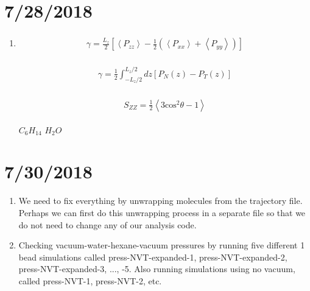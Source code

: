 \documentclass[12pt,reqno]{amsart}
\numberwithin{equation}{section}
\begin{document}
\section{7/28/2018}
\begin{enumerate}
\item 
\begin{align}
\begin{split}
\gamma = \frac{L_z}{2}\left[\left<P_{zz}\right> - \frac{1}{2}(\left<P_{xx}\right> + \left<P_{yy}\right>)\right]
\end{split}
\end{align}

\begin{align}
\begin{split}
\gamma = \frac{1}{2}\int_{-L_z/2}^{L_z/2}dz\left[P_N(z) - P_T(z)\right]
\end{split}
\end{align}

\begin{align}
\begin{split}
S_{ZZ} = \frac{1}{2}\left<3\text{cos}^2\theta - 1\right>
\end{split}
\end{align}

$C_6H_{14}$
$H_2O$



\end{enumerate}


\section{7/30/2018}
\begin{enumerate}
\item We need to fix everything by unwrapping molecules from the trajectory file.  Perhaps we can first do this unwrapping process in a separate file so that we do not need to change any of our analysis code.  
\item Checking vacuum-water-hexane-vacuum pressures by running five different 1 bead simulations called press-NVT-expanded-1, press-NVT-expanded-2, press-NVT-expanded-3, ..., -5.  Also running simulations using no vacuum, called press-NVT-1, press-NVT-2, etc.  
\end{enumerate}
\end{document}
